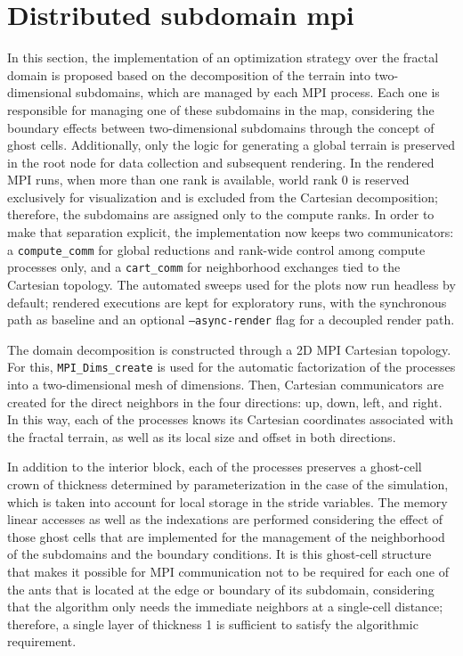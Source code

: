 \section{Distributed subdomain mpi}


In this section, the implementation of an optimization strategy over the fractal domain is proposed based on the decomposition of the terrain into two-dimensional subdomains, which are managed by each MPI process. Each one is responsible for managing one of these subdomains in the map, considering the boundary effects between two-dimensional subdomains through the concept of ghost cells. Additionally, only the logic for generating a global terrain is preserved in the root node for data collection and subsequent rendering. In the rendered MPI runs, when more than one rank is available, world rank 0 is reserved exclusively for visualization and is excluded from the Cartesian decomposition; therefore, the subdomains are assigned only to the compute ranks. In order to make that separation explicit, the implementation now keeps two communicators: a \texttt{compute\_comm} for global reductions and rank-wide control among compute processes only, and a \texttt{cart\_comm} for neighborhood exchanges tied to the Cartesian topology. The automated sweeps used for the plots now run headless by default; rendered executions are kept for exploratory runs, with the synchronous path as baseline and an optional \texttt{--async-render} flag for a decoupled render path.

The domain decomposition is constructed through a 2D MPI Cartesian topology. For this, \texttt{MPI\_Dims\_create} is used for the automatic factorization of the processes into a two-dimensional mesh of dimensions. Then, Cartesian communicators are created for the direct neighbors in the four directions: up, down, left, and right. In this way, each of the processes knows its Cartesian coordinates associated with the fractal terrain, as well as its local size and offset in both directions.

In addition to the interior block, each of the processes preserves a ghost-cell crown of thickness determined by parameterization in the case of the simulation, which is taken into account for local storage in the stride variables. The memory linear accesses as well as the indexations are performed considering the effect of those ghost cells that are implemented for the management of the neighborhood of the subdomains and the boundary conditions. It is this ghost-cell structure that makes it possible for MPI communication not to be required for each one of the ants that is located at the edge or boundary of its subdomain, considering that the algorithm only needs the immediate neighbors at a single-cell distance; therefore, a single layer of thickness 1 is sufficient to satisfy the algorithmic requirement.

